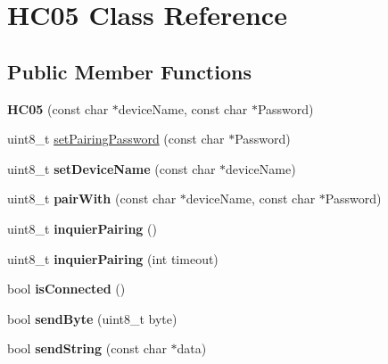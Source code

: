 \hypertarget{class_h_c05}{}\section{H\+C05 Class Reference}
\label{class_h_c05}
\subsection*{Public Member Functions}
\begin{DoxyCompactItemize}
\item 
{\bfseries H\+C05} (const char $\ast$device\+Name, const char $\ast$Password)\hypertarget{class_h_c05_a16354dfb5fb4aecd0e46f6b1e52bba19}{}\label{class_h_c05_a16354dfb5fb4aecd0e46f6b1e52bba19}

\item 
uint8\+\_\+t \hyperlink{class_h_c05_aa898f70439bdfa3f1ee0aba70bd6e236}{set\+Pairing\+Password} (const char $\ast$Password)
\item 
uint8\+\_\+t {\bfseries set\+Device\+Name} (const char $\ast$device\+Name)\hypertarget{class_h_c05_a4cf49a9ae47ab51d4dcc62c7e930665c}{}\label{class_h_c05_a4cf49a9ae47ab51d4dcc62c7e930665c}

\item 
uint8\+\_\+t {\bfseries pair\+With} (const char $\ast$device\+Name, const char $\ast$Password)\hypertarget{class_h_c05_a90cfb4e5b0d784dc419d93e317bffc72}{}\label{class_h_c05_a90cfb4e5b0d784dc419d93e317bffc72}

\item 
uint8\+\_\+t {\bfseries inquier\+Pairing} ()\hypertarget{class_h_c05_ad649d18c9a925a65d26ffe7f5c668df5}{}\label{class_h_c05_ad649d18c9a925a65d26ffe7f5c668df5}

\item 
uint8\+\_\+t {\bfseries inquier\+Pairing} (int timeout)\hypertarget{class_h_c05_a714e778e6eb2ed8852dc9cf38788b600}{}\label{class_h_c05_a714e778e6eb2ed8852dc9cf38788b600}

\item 
bool {\bfseries is\+Connected} ()\hypertarget{class_h_c05_adf8eba3cca2adc175fc2fc67fb226aa1}{}\label{class_h_c05_adf8eba3cca2adc175fc2fc67fb226aa1}

\item 
bool {\bfseries send\+Byte} (uint8\+\_\+t byte)\hypertarget{class_h_c05_a4ab3baf3969a57260abf0aead48eefd9}{}\label{class_h_c05_a4ab3baf3969a57260abf0aead48eefd9}

\item 
bool {\bfseries send\+String} (const char $\ast$data)\hypertarget{class_h_c05_a350d418bd42b13c8b71e9ee535513de4}{}\label{class_h_c05_a350d418bd42b13c8b71e9ee535513de4}


\end{DoxyCompactItemize}
